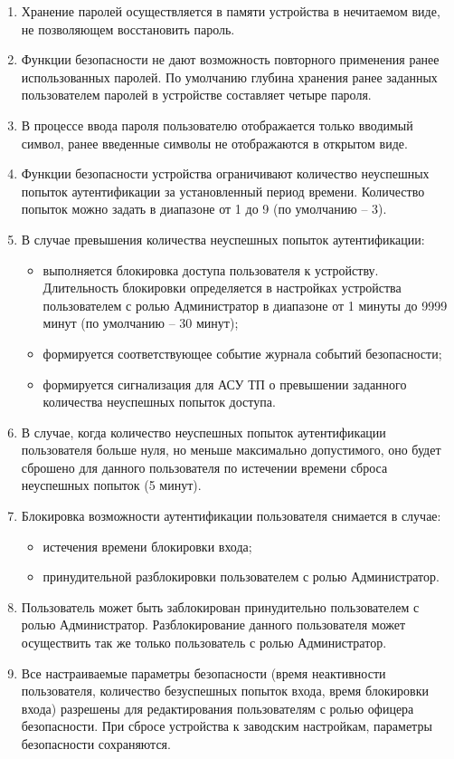 \begin{enumerate}
\begin{enumerate}
\begin{itemize}
\end{itemize}
\item Хранение паролей осуществляется в памяти устройства в нечитаемом виде, не позволяющем восстановить пароль.
\item Функции безопасности не дают возможность повторного применения ранее использованных паролей.
По умолчанию глубина хранения ранее заданных пользователем паролей в устройстве составляет четыре пароля.
\item В процессе ввода пароля пользователю отображается только вводимый символ, ранее введенные символы не отображаются в открытом виде.
\item Функции безопасности устройства ограничивают количество неуспешных попыток аутентификации за установленный период времени.
Количество попыток можно задать в диапазоне от 1 до 9 (по умолчанию – 3).
\item В случае превышения количества неуспешных попыток аутентификации:
\begin{itemize}
  \item выполняется блокировка доступа пользователя к устройству. Длительность блокировки определяется в настройках устройства пользователем с ролью Администратор в диапазоне от 1 минуты до 9999 минут (по умолчанию – 30 минут);
  \item формируется соответствующее событие журнала событий безопасности;
  \item формируется сигнализация для АСУ ТП о превышении заданного количества неуспешных попыток доступа.
\end{itemize}
\item В случае, когда количество неуспешных попыток аутентификации пользователя больше нуля, но меньше максимально допустимого, оно будет сброшено для данного пользователя по истечении времени сброса неуспешных попыток (5 минут).
\item Блокировка возможности аутентификации пользователя снимается в случае:
\begin{itemize}
  \item истечения времени блокировки входа;
  \item принудительной разблокировки пользователем с ролью Администратор.
\end{itemize}
\item Пользователь может быть заблокирован принудительно пользователем с ролью Администратор. Разблокирование данного пользователя может осуществить так же только пользователь с ролью Администратор.
\item Все настраиваемые параметры безопасности (время неактивности пользователя, количество безуспешных попыток входа, время блокировки входа) разрешены для редактирования пользователям с ролью офицера безопасности. При сбросе устройства к заводским настройкам, параметры безопасности сохраняются.


\end{enumerate}
\end{enumerate}
